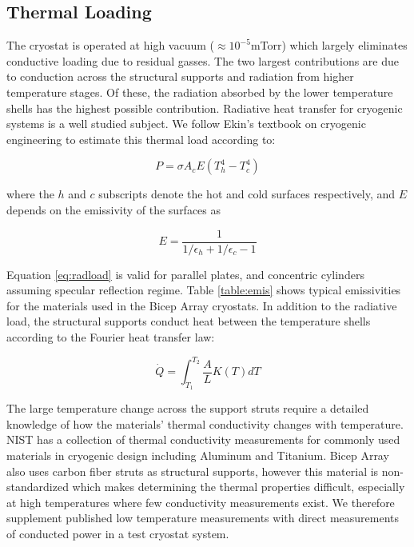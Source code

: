 \documentclass[12pt]{article}
\begin{document}
\subsection{Thermal Loading}
The cryostat is operated at high vacuum ($\approx 10^{-5}$mTorr) which largely
eliminates conductive loading due to residual gasses. The two largest
contributions are due to conduction across the structural supports and
radiation from higher temperature stages. Of these, the radiation absorbed by
the lower temperature shells has the highest possible contribution. Radiative
heat transfer for cryogenic systems is a well studied subject. We follow
Ekin's textbook on cryogenic engineering to estimate this thermal load
according to:

\begin{equation}
	P=\sigma A_{c} E (T_{h}^4 - T_{c}^4)
	\label{eq:radload}
\end{equation}

where the $h$ and $c$ subscripts denote the hot and cold surfaces
respectively, and $E$ depends on the emissivity of the surfaces as

\begin{equation}
	E=\frac{1}{1/\epsilon _h + 1/\epsilon _c - 1}
\end{equation}

Equation \ref{eq:radload} is valid for parallel plates, and concentric
cylinders assuming specular reflection regime. Table \ref{table:emis} shows
typical emissivities for the materials used in the Bicep Array cryostats. In
addition to the radiative load, the structural supports conduct heat between
the temperature shells according to the Fourier heat transfer law:


\begin{equation}
	\dot{Q}=\int _{T_1} ^{T_2} \frac{A}{L}K(T)dT
\end{equation}

The large temperature change across the support struts require a detailed
knowledge of how the materials' thermal conductivity changes with temperature.
NIST has a collection of thermal conductivity measurements for commonly used
materials in cryogenic design including Aluminum and Titanium. Bicep Array
also uses carbon fiber struts as structural supports, however this material is
non-standardized which makes determining the thermal properties difficult,
especially at high temperatures where few conductivity measurements exist. We
therefore supplement published low temperature measurements with direct
measurements of conducted power in a test cryostat system.
\end{document}
